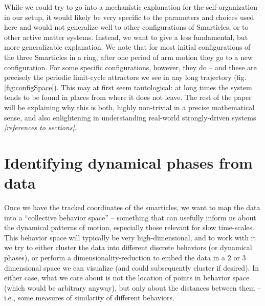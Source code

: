 \documentclass[11pt]{article}
\renewcommand{\=}[1]{\stackrel{#1}{=}} %
\renewcommand{\(}{\left (}
\renewcommand{\)}{\right  )}
\renewcommand{\[}{\left [}
\renewcommand{\]}{\right ]}
\newcommand{\<}{\left <}
\renewcommand{\>}{\right >}
\theoremstyle{definition}
\theoremstyle{remark}
\renewcommand{\todo}[1]{\textit{\color{red}[#1]}}
\begin{document}
While we could try to go into a mechanistic explanation for the self-organization in our setup, it would likely be very specific to the parameters and choices used here and would not generalize well to other configurations of Smarticles, or to other active matter systems. Instead, we want to give a less fundamental, but more generalizable explanation. We note that for most initial configurations of the three Smarticles in a ring, after one period of arm motion they go to a new configuration. For some specific configurations, however, they do -- and these are precisely the periodic limit-cycle attractors we see in any long trajectory (fig. \ref{fig:configSpace}). This may at first seem tautological: at long times the system tends to be found in places from where it does not leave. The rest of the paper will be explaining why this is both, highly non-trivial in a precise mathematical sense, and also enlightening in understanding real-world strongly-driven systems \todo{references to sections}.


\appendix
\renewcommand{\thesection}{\Alph{section}} 
\section{Identifying dynamical phases from data} \label{app:dataAnal}

Once we have the tracked coordinates of the smarticles, we want to map the data into a ``collective behavior space'' -- something that can usefully inform us about the dynamical patterns of motion, especially those relevant for slow time-scales. This behavior space will typically be very high-dimensional, and to work with it we try to either cluster the data into different discrete behaviors (or dynamical phases), or perform a dimensionality-reduction to embed the data in a 2 or 3 dimensional space we can visualize (and could subsequently cluster if desired). In either case, what we care about is not the location of points in behavior space (which would be arbitrary anyway), but only about the distances between them -- i.e., some measures of similarity of different behaviors. 
\end{document}
